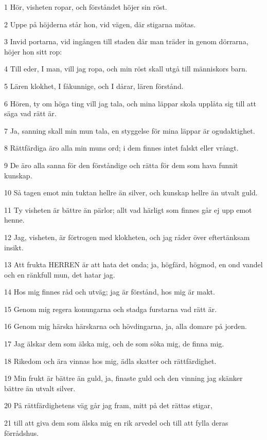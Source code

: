 \par 1 Hör, visheten ropar, och förståndet höjer sin röst.
\par 2 Uppe på höjderna står hon, vid vägen, där stigarna mötas.
\par 3 Invid portarna, vid ingången till staden där man träder in genom dörrarna, höjer hon sitt rop:
\par 4 Till eder, I man, vill jag ropa, och min röst skall utgå till människors barn.
\par 5 Lären klokhet, I fåkunnige, och I dårar, lären förstånd.
\par 6 Hören, ty om höga ting vill jag tala, och mina läppar skola upplåta sig till att säga vad rätt är.
\par 7 Ja, sanning skall min mun tala, en styggelse för mina läppar är ogudaktighet.
\par 8 Rättfärdiga äro alla min muns ord; i dem finnes intet falskt eller vrångt.
\par 9 De äro alla sanna för den förståndige och rätta för dem som hava funnit kunskap.
\par 10 Så tagen emot min tuktan hellre än silver, och kunskap hellre än utvalt guld.
\par 11 Ty visheten är bättre än pärlor; allt vad härligt som finnes går ej upp emot henne.
\par 12 Jag, visheten, är förtrogen med klokheten, och jag råder över eftertänksam insikt.
\par 13 Att frukta HERREN är att hata det onda; ja, högfärd, högmod, en ond vandel och en ränkfull mun, det hatar jag.
\par 14 Hos mig finnes råd och utväg; jag är förstånd, hos mig är makt.
\par 15 Genom mig regera konungarna och stadga furstarna vad rätt är.
\par 16 Genom mig härska härskarna och hövdingarna, ja, alla domare på jorden.
\par 17 Jag älskar dem som älska mig, och de som söka mig, de finna mig.
\par 18 Rikedom och ära vinnas hos mig, ädla skatter och rättfärdighet.
\par 19 Min frukt är bättre än guld, ja, finaste guld och den vinning jag skänker bättre än utvalt silver.
\par 20 På rättfärdighetens väg går jag fram, mitt på det rättas stigar,
\par 21 till att giva dem som älska mig en rik arvedel och till att fylla deras förrådshus.
